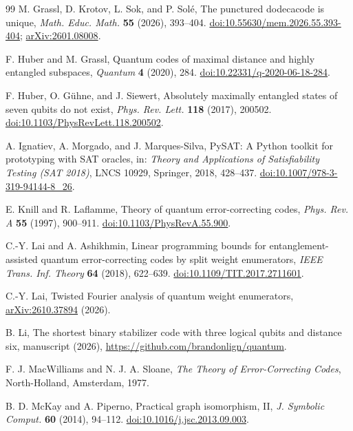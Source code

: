 \documentclass[11pt]{article}
\theoremstyle{definition}
\theoremstyle{remark}
\begin{document}
\begin{thebibliography}{99}
M. Grassl, D. Krotov, L. Sok, and P. Sol\'e,
The punctured dodecacode is unique,
\emph{Math. Educ. Math.} \textbf{55} (2026), 393--404.
\href{https://doi.org/10.55630/mem.2026.55.393-404}{doi:10.55630/mem.2026.55.393-404};
\href{https://arxiv.org/abs/2601.08008}{arXiv:2601.08008}.

F. Huber and M. Grassl,
Quantum codes of maximal distance and highly entangled subspaces,
\emph{Quantum} \textbf{4} (2020), 284.
\href{https://doi.org/10.22331/q-2020-06-18-284}{doi:10.22331/q-2020-06-18-284}.

F. Huber, O. G\"uhne, and J. Siewert,
Absolutely maximally entangled states of seven qubits do not exist,
\emph{Phys. Rev. Lett.} \textbf{118} (2017), 200502.
\href{https://doi.org/10.1103/PhysRevLett.118.200502}{doi:10.1103/PhysRevLett.118.200502}.

A. Ignatiev, A. Morgado, and J. Marques-Silva,
PySAT: A Python toolkit for prototyping with SAT oracles, in:
\emph{Theory and Applications of Satisfiability Testing (SAT 2018)},
LNCS 10929, Springer, 2018, 428--437.
\href{https://doi.org/10.1007/978-3-319-94144-8_26}{doi:10.1007/978-3-319-94144-8\_26}.

E. Knill and R. Laflamme,
Theory of quantum error-correcting codes,
\emph{Phys. Rev. A} \textbf{55} (1997), 900--911.
\href{https://doi.org/10.1103/PhysRevA.55.900}{doi:10.1103/PhysRevA.55.900}.

C.-Y. Lai and A. Ashikhmin,
Linear programming bounds for entanglement-assisted quantum
error-correcting codes by split weight enumerators,
\emph{IEEE Trans. Inf. Theory} \textbf{64} (2018), 622--639.
\href{https://doi.org/10.1109/TIT.2017.2711601}{doi:10.1109/TIT.2017.2711601}.

C.-Y. Lai, Twisted Fourier analysis of quantum weight enumerators,
\href{https://arxiv.org/abs/2610.37894}{arXiv:2610.37894} (2026).

B. Li, The shortest binary stabilizer code with three logical qubits and
distance six, manuscript (2026), \url{https://github.com/brandonlign/quantum}.

F. J. MacWilliams and N. J. A. Sloane,
\emph{The Theory of Error-Correcting Codes},
North-Holland, Amsterdam, 1977.

B. D. McKay and A. Piperno,
Practical graph isomorphism, II,
\emph{J. Symbolic Comput.} \textbf{60} (2014), 94--112.
\href{https://doi.org/10.1016/j.jsc.2013.09.003}{doi:10.1016/j.jsc.2013.09.003}.


\end{thebibliography}
\end{document}
